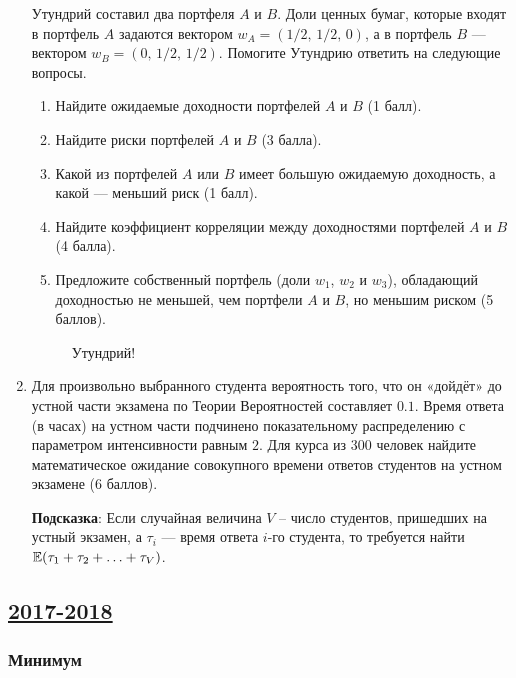 \begin{enumerate}
Утундрий составил два портфеля $A$ и $B$. Доли ценных бумаг, которые входят
в портфель $A$ задаются вектором $w_A = (1/2, \, 1/2, \, 0)$, а в портфель $B$ —
вектором $w_B = (0, \, 1/2, \, 1/2)$.
Помогите Утундрию ответить на следующие вопросы.
\begin{enumerate}
  \item Найдите ожидаемые доходности портфелей $A$ и $B$ (1 балл).
  \item Найдите риски портфелей $A$ и $B$ (3 балла).
  \item Какой из портфелей $A$ или $B$ имеет большую ожидаемую доходность,
  а какой — меньший риск (1 балл).
  \item Найдите коэффициент корреляции между доходностями портфелей $A$ и $B$ (4 балла).
  \item Предложите собственный портфель (доли $w_{1}$, $w_{2}$ и $w_{3}$),
  обладающий доходностью не меньшей, чем портфели $A$ и $B$, но меньшим риском (5 баллов).
\end{enumerate}

\begin{figure}[h]
    \noindent{}
    \caption{Утундрий!}
    \label{ut2018}
\end{figure}


    \item Для произвольно выбранного студента вероятность того, что он «дойдёт»
    до устной части экзамена по Теории Вероятностей составляет $0.1$. Время
    ответа (в часах) на устном части подчинено показательному распределению с
    параметром интенсивности равным $2$. Для курса из $300$ человек найдите математическое ожидание
    совокупного времени ответов студентов на устном экзамене (6 баллов).

    \textbf{Подсказка}: Если случайная величина $V$ – число студентов,
    пришедших на устный экзамен, а $\tau_{i}$ — время ответа $i$-го студента,
    то требуется найти $\operatorname{\mathbb{E}}(\tau_{1}+\tau_{2}+ \ldots +\tau_{V})$.


\end{enumerate}


\newpage
\subsection[2017-2018]{\hyperref[sec:sol_kr_02_2017_2018]{2017-2018}}
\label{sec:kr_02_2017_2018}

\subsubsection*{Минимум}

